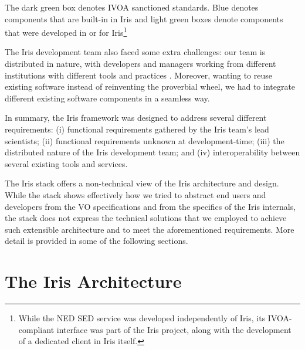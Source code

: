 \documentclass[preprint,authoryear,5p]{elsarticle}
\begin{document}
The dark green box denotes IVOA sanctioned standards. Blue denotes components
that are built-in in Iris and light green boxes denote components that were developed
in or for Iris\footnote{While the NED SED service was developed independently of Iris,
its IVOA-compliant interface was part of the Iris project, along with the development of a
dedicated client in Iris itself.}

The Iris development team also faced some extra challenges: our team is
distributed in nature, with developers and managers working from different
institutions with different tools and practices \citep{2012SPIE.8449E..0IE}.
Moreover, wanting to reuse existing software instead of reinventing the
proverbial wheel, we had to integrate different existing software components in
a seamless way.

In summary, the Iris framework was designed to address several different
requirements: (i) functional requirements gathered by the Iris team's lead
scientists; (ii) functional requirements unknown at development-time; (iii) the
distributed nature of the Iris development team; and (iv) interoperability between 
several existing tools and services.

The Iris stack offers a non-technical view of the Iris architecture and design.
While the stack shows effectively how we tried to abstract end users and developers
from the VO specifications and from the specifics of the Iris internals, the stack does
not express the technical solutions that we employed to achieve such extensible
architecture and to meet the aforementioned requirements. More detail is
provided in some of the following sections.

\section{The Iris Architecture} \label{sec:architecture}
\end{document}

